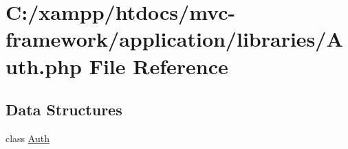 \hypertarget{_auth_8php}{}\section{C\+:/xampp/htdocs/mvc-\/framework/application/libraries/\+Auth.php File Reference}
\label{_auth_8php}
\subsection*{Data Structures}
\begin{DoxyCompactItemize}
\item 
class \hyperlink{class_auth}{Auth}
\end{DoxyCompactItemize}
